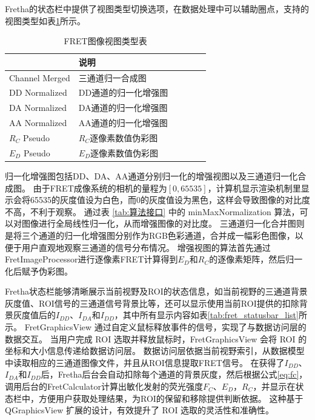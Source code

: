 Fretha的状态栏中提供了视图类型切换选项，在数据处理中可以辅助圈点，支持的视图类型如表\ref{tab:fretha_viewtype_list}所示。
\begin{table}[htbp]
  \centering
  \caption[FRET图像视图类型]{FRET图像视图类型表}
  \label{tab:fretha_viewtype_list}
    \begin{tabularx}{\linewidth}{
    >{\centering\arraybackslash}X
    >{\centering\arraybackslash}X
    >{\centering\arraybackslash}X
    >{\centering\arraybackslash}X
    >{\centering\arraybackslash}X
    >{\centering\arraybackslash}X} %
      \toprule[1.5pt]
      {信息} & {说明} \\
      \midrule
      Channel Merged & 三通道归一合成图 \\
      DD Normalized & DD通道的归一化增强图 \\
      DA Normalized & DA通道的归一化增强图 \\
      AA Normalized & AA通道的归一化增强图 \\
      $R_C$ Pseudo & $R_C$逐像素数值伪彩图 \\
      $E_D$ Pseudo & $E_D$逐像素数值伪彩图 \\
      \bottomrule[1.5pt]
    \end{tabularx}
\end{table}
归一化增强图包括DD、DA、AA通道分别归一化的增强视图以及三通道归一化合成图。
由于FRET成像系统的相机的量程为$[0,65535]$，计算机显示渲染机制里显示会将65535的灰度值设为白色，而0的灰度值设为黑色，这样会导致图像的对比度不高，不利于观察。
通过表 \ref{tab:算法接口} 中的 minMaxNormalization 算法，可以对图像进行全局线性归一化，从而增强图像的对比度。
三通道归一化合并图则是将三个通道的归一化增强图分别作为RGB色彩通道，合并成一幅彩色图像，以便于用户直观地观察三通道的信号分布情况。
增强视图的算法首先通过FretImageProcessor进行逐像素FRET计算得到$E_D$和$R_C$的逐像素矩阵，然后归一化后赋予伪彩图。

Fretha状态栏能够清晰展示当前视野及ROI的状态信息，如当前视野的三通道背景灰度值、ROI信号的三通道信号背景比等，还可以显示使用当前ROI提供的扣除背景灰度值后的$I_{DD}$、$I_{DA}$和$I_{DD}$，其中所有显示内容如表\ref{tab:fret_statusbar_list}所示。
FretGraphicsView 通过自定义鼠标释放事件的信号，实现了与数据访问层的数据交互。
当用户完成 ROI 选取并释放鼠标时，FretGraphicsView 会将 ROI 的坐标和大小信息传递给数据访问层。
数据访问层依据当前视野索引，从数据模型中读取相应的三通道图像文件，并且从ROI信息提取FRET信号。
在获得了$I_{DD}$、$I_{DA}$和$I_{DD}$后，Fretha后台会自动扣除每个通道的背景灰度，然后根据公式\ref{eq:fc}，调用后台的FretCalculator计算出敏化发射的荧光强度$F_C$、$E_D$，$R_C$，并显示在状态栏中，方便用户获取处理结果，为ROI的保留和移除提供判断依据。
这种基于 QGraphicsView 扩展的设计，有效提升了 ROI 选取的灵活性和准确性。 


